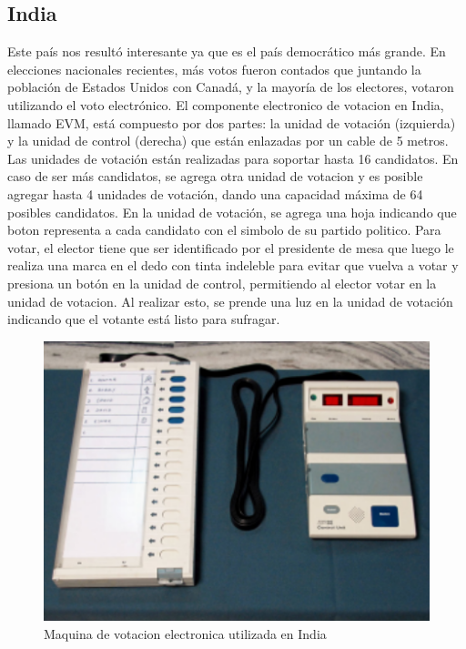 \subsection{India}
Este país nos resultó interesante ya que es el país democrático más grande. En elecciones nacionales recientes, más votos fueron contados que juntando la población de Estados Unidos con Canadá, y la mayoría de los electores, votaron utilizando el voto electrónico.
El componente electronico de votacion en India, llamado EVM, está compuesto por dos partes: la unidad de votación (izquierda) y la unidad de control (derecha) que están enlazadas por un cable de 5 metros. Las unidades de votación están realizadas para soportar hasta 16 candidatos. En caso de ser más candidatos, se agrega otra unidad de votacion y es posible agregar hasta 4 unidades de votación, dando una capacidad máxima de 64 posibles candidatos.   En la unidad de votación, se agrega una hoja indicando que boton representa a cada candidato con el simbolo de su partido politico. Para votar, el elector tiene que ser identificado por el presidente de mesa que luego le realiza una marca en el dedo con tinta indeleble para evitar que vuelva a votar y presiona un botón en la unidad de control, permitiendo al elector votar en la unidad de votacion. Al realizar esto, se prende una luz en la unidad de votación indicando que el votante está listo para sufragar.

\begin{figure}[h]
\includegraphics{Imagenes/almacenamiento1}
\caption{Maquina de votacion electronica utilizada en India }
\end{figure}

